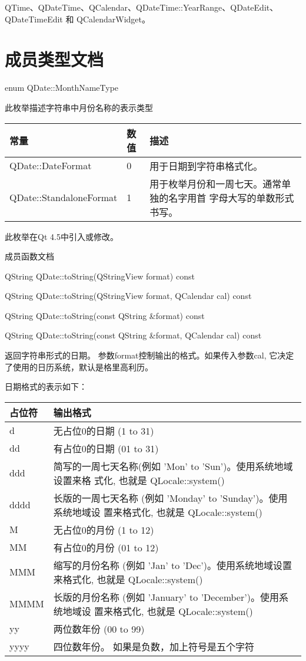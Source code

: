 \begin{notice}[另请参阅]
QTime、QDateTime、QCalendar、QDateTime::YearRange、QDateEdit、QDateTimeEdit 和 QCalendarWidget。
\end{notice}


\splitLine

\section{成员类型文档}

enum QDate::MonthNameType

此枚举描述字符串中月份名称的表示类型

\begin{tabular}{|l|l|m{20em}|}
\hline
常量	&数值&	描述\\
\hline
QDate::DateFormat&	0&	用于日期到字符串格式化。\\
\hline
QDate::StandaloneFormat	&1&	用于枚举月份和一周七天。通常单独的名字用首
  字母大写的单数形式书写。\\
\hline
\end{tabular}

此枚举在Qt 4.5中引入或修改。

\splitLine

成员函数文档

QString QDate::toString(QStringView format) const

QString QDate::toString(QStringView format, QCalendar cal) const

QString QDate::toString(const QString \&format) const

QString QDate::toString(const QString \&format, QCalendar cal) const

返回字符串形式的日期。 参数format控制输出的格式。如果传入参数cal, 它决定了使用的日历系统，默认是格里高利历。

日期格式的表示如下：

\begin{tabular}{|l|m{30em}|}
\hline
占位符 &	输出格式\\
\hline
d&	无占位0的日期 (1 to 31)\\
\hline
dd&	有占位0的日期 (01 to 31)\\
\hline
ddd&	简写的一周七天名称(例如 'Mon' to 'Sun')。使用系统地域设置来格
     式化, 也就是 QLocale::system()\\
\hline
dddd&	长版的一周七天名称 (例如 'Monday' to 'Sunday')。使用系统地域设
      置来格式化, 也就是 QLocale::system()\\
\hline
M&	无占位0的月份 (1 to 12)\\
\hline
MM&	有占位0的月份 (01 to 12)\\
\hline
MMM&	缩写的月份名称 (例如 'Jan' to 'Dec')。使用系统地域设置来格式化,
     也就是 QLocale::system()\\
\hline
MMMM&	长版的月份名称 (例如 'January' to 'December')。使用系统地域设
      置来格式化, 也就是 QLocale::system()\\
\hline
yy&	两位数年份 (00 to 99)\\
\hline
yyyy&	四位数年份。 如果是负数，加上符号是五个字符\\
\hline
\end{tabular}

